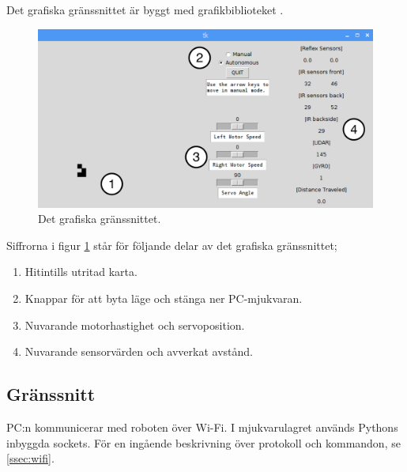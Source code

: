 \documentclass[a4paper,11pt]{article}
\begin{document}
Det grafiska gränssnittet är byggt med grafikbiblioteket \cite{tkinter}.

\begin{figure}[h!]
    \centering
    \includegraphics[scale=0.55]{gui_annotated.png}
    \caption{Det grafiska gränssnittet.}
    \label{fig:gui}
\end{figure}

Siffrorna i figur \ref{fig:gui} står för följande delar av det grafiska gränssnittet;
\begin{enumerate}
\item Hitintills utritad karta.
\item Knappar för att byta läge och stänga ner PC-mjukvaran.
\item Nuvarande motorhastighet och servoposition.
\item Nuvarande sensorvärden och avverkat avstånd.
\end{enumerate}

\subsection{Gränssnitt} \label{ssec:PCInterface}

PC:n kommunicerar med roboten över Wi-Fi. I mjukvarulagret används Pythons inbyggda sockets. För en ingående beskrivning över protokoll och kommandon, se \ref{ssec:wifi}.
\end{document}
